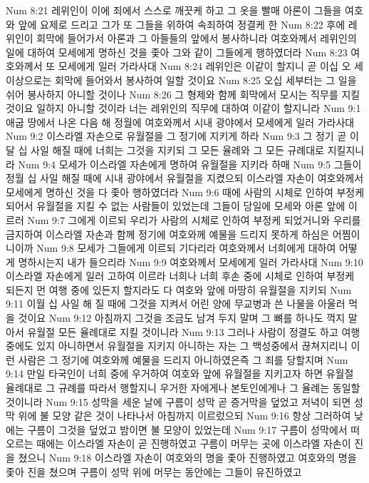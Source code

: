 Num 8:21  레위인이 이에 죄에서 스스로 깨끗케 하고 그 옷을 빨매 아론이 그들을 여호와 앞에 요제로 드리고 그가 또 그들을 위하여 속죄하여 정결케 한
Num 8:22  후에 레위인이 회막에 들어가서 아론과 그 아들들의 앞에서 봉사하니라 여호와께서 레위인의 일에 대하여 모세에게 명하신 것을 좇아 그와 같이 그들에게 행하였더라
Num 8:23  여호와께서 또 모세에게 일러 가라사대
Num 8:24  레위인은 이같이 할지니 곧 이십 오 세 이상으로는 회막에 들어와서 봉사하여 일할 것이요
Num 8:25  오십 세부터는 그 일을 쉬어 봉사하지 아니할 것이나
Num 8:26  그 형제와 함께 회막에서 모시는 직무를 지킬 것이요 일하지 아니할 것이라 너는 레위인의 직무에 대하여 이같이 할지니라
Num 9:1  애굽 땅에서 나온 다음 해 정월에 여호와께서 시내 광야에서 모세에게 일러 가라사대
Num 9:2  이스라엘 자손으로 유월절을 그 정기에 지키게 하라
Num 9:3  그 정기 곧 이달 십 사일 해질 때에 너희는 그것을 지키되 그 모든 율례와 그 모든 규례대로 지킬지니라
Num 9:4  모세가 이스라엘 자손에게 명하여 유월절을 지키라 하매
Num 9:5  그들이 정월 십 사일 해질 때에 시내 광야에서 유월절을 지켰으되 이스라엘 자손이 여호와께서 모세에게 명하신 것을 다 좇아 행하였더라
Num 9:6  때에 사람의 시체로 인하여 부정케 되어서 유월절을 지킬 수 없는 사람들이 있었는데 그들이 당일에 모세와 아론 앞에 이르러
Num 9:7  그에게 이르되 우리가 사람의 시체로 인하여 부정케 되었거니와 우리를 금지하여 이스라엘 자손과 함께 정기에 여호와께 예물을 드리지 못하게 하심은 어찜이니이까
Num 9:8  모세가 그들에게 이르되 기다리라 여호와께서 너희에게 대하여 어떻게 명하시는지 내가 들으리라
Num 9:9  여호와께서 모세에게 일러 가라사대
Num 9:10  이스라엘 자손에게 일러 고하여 이르라 너희나 너희 후손 중에 시체로 인하여 부정케 되든지 먼 여행 중에 있든지 할지라도 다 여호와 앞에 마땅히 유월절을 지키되
Num 9:11  이월 십 사일 해 질 때에 그것을 지켜서 어린 양에 무교병과 쓴 나물을 아울러 먹을 것이요
Num 9:12  아침까지 그것을 조금도 남겨 두지 말며 그 뼈를 하나도 꺽지 말아서 유월절 모든 율례대로 지킬 것이니라
Num 9:13  그러나 사람이 정결도 하고 여행 중에도 있지 아니하면서 유월절을 지키지 아니하는 자는 그 백성중에서 끊쳐지리니 이런 사람은 그 정기에 여호와께 예물을 드리지 아니하였은즉 그 죄를 당할지며
Num 9:14  만일 타국인이 너희 중에 우거하여 여호와 앞에 유월절을 지키고자 하면 유월절 율례대로 그 규례를 따라서 행할지니 우거한 자에게나 본토인에게나 그 율례는 동일할 것이니라
Num 9:15  성막을 세운 날에 구름이 성막 곧 증거막을 덮었고 저녁이 되면 성막 위에 불 모양 같은 것이 나타나서 아침까지 이르렀으되
Num 9:16  항상 그러하여 낮에는 구름이 그것을 덮었고 밤이면 불 모양이 있었는데
Num 9:17  구름이 성막에서 떠오르는 때에는 이스라엘 자손이 곧 진행하였고 구름이 머무는 곳에 이스라엘 자손이 진을 쳤으니
Num 9:18  이스라엘 자손이 여호와의 명을 좇아 진행하였고 여호와의 명을 좇아 진을 쳤으며 구름이 성막 위에 머무는 동안에는 그들이 유진하였고
